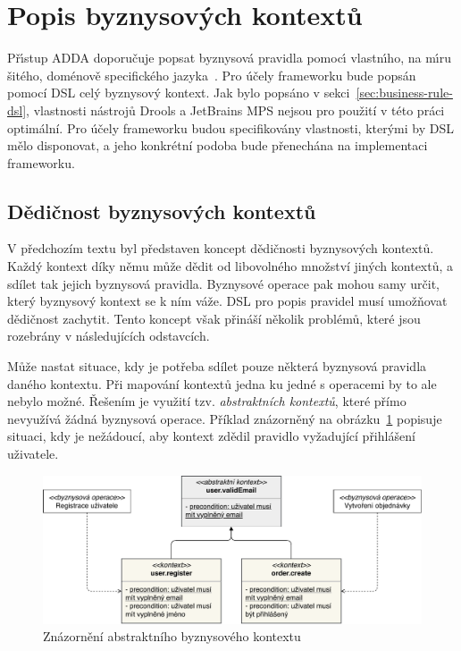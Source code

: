 \section{Popis byznysových kontextů}

Př\'{\i}stup \gls{ADDA} doporučuje popsat byznysová pravidla pomoc\'{\i}
vlastn\'{\i}ho, na m\'{\i}ru šitého, doménově specifického jazyka~\cite{cemus2015automated}.
Pro účely frameworku bude popsán pomocí \gls{DSL} celý byznysový kontext.
Jak bylo popsáno v sekci~\ref{sec:business-rule-dsl}, vlastnosti nástrojů Drools a JetBrains MPS
nejsou pro použití v této práci optimální. Pro účely frameworku budou specifikovány vlastnosti,
kterými by \gls{DSL} mělo disponovat, a jeho konkrétní podoba bude přenechána na implementaci
frameworku.

\subsection{Dědičnost byznysových kontextů}\label{sec:context-inheritance}

V předchozím textu byl představen koncept dědičnosti byznysových kontextů.
Každý kontext díky němu může dědit od libovolného množství jiných kontextů,
a sdílet tak jejich byznysová pravidla. Byznysové operace pak mohou samy určit,
který byznysový kontext se k ním váže. \gls{DSL} pro popis pravidel musí umožňovat
dědičnost zachytit. Tento koncept však přináší několik problémů, které jsou rozebrány
v následujících odstavcích.

Může nastat situace, kdy je potřeba sdílet pouze některá byznysová pravidla
daného kontextu. Při mapování kontextů jedna ku jedné s operacemi by to ale
nebylo možné. Řešením je využití tzv. \textit{abstraktních kontextů},
které přímo nevyužívá žádná byznysová operace. Příklad znázorněný na
obrázku~\ref{fig:abstract-context} popisuje situaci, kdy je nežádoucí,
aby kontext  zdědil pravidlo vyžadující přihlášení uživatele.

\begin{figure}
    \centering
    \includegraphics[keepaspectratio=true, width=1\linewidth]{figures/abstract-context.pdf}
    \caption{Znázornění abstraktního byznysového kontextu}
    \label{fig:abstract-context}
\end{figure}

